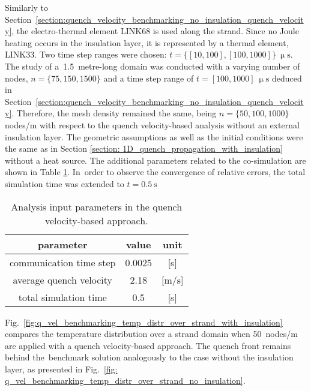 
Similarly to Section~\ref{section:quench_velocity_benchmarking_no_insulation_quench_velocity}, the electro-thermal element LINK68 is used along the strand. Since no Joule heating occurs in the insulation layer, it is represented by a thermal element, LINK33. Two time step ranges were chosen: $t=\{[10, 100], [100, 1000]\}~\upmu \text{s}$. The study of a~1.5~metre-long domain was conducted with a varying number of nodes, $n=\{75, 150, 1500\}$ and a time step range of $t=[100, 1000]~\upmu \text{s}$ deduced in Section~\ref{section:quench_velocity_benchmarking_no_insulation_quench_velocity}. Therefore, the mesh density remained the same, being $n=\{50, 100, 1000\}$ nodes/m  with respect to the quench velocity-based analysis without an external insulation layer. The geometric assumptions as well as the initial conditions were the same as in Section \ref{section: 1D_quench_propagation_with_insulation} without a heat source. The additional parameters related to the co-simulation are shown in Table \ref{table:1d_qv_benchmarking_geometry__with_insulation_parameters_quench_velocity}. In~order to observe the convergence of relative errors, the total simulation time was extended to $t=0.5~\text{s}$

\begin{table}[H]
    \caption{Analysis input parameters in the quench velocity-based approach.} 
    \vspace{-1.em} 
    \fontsize{10}{10}
    \selectfont 
    \renewcommand{\arraystretch}{1.5}
    \begin{center}
        \begin{tabular}{ ccc }  
        \hline
        parameter & value & unit \\
        \hline
        communication time step & 0.0025 & [s] \\
        average quench velocity & 2.18 & [m/s] \\
        total simulation time & 0.5 & [s] \\
        \hline 
        \end{tabular}
    \end{center}  
    \label{table:1d_qv_benchmarking_geometry__with_insulation_parameters_quench_velocity} 
\end{table}

Fig.~\ref{fig:q_vel_benchmarking_temp_distr_over_strand_with_insulation} compares the temperature distribution over a strand domain when 50~nodes/m are applied with a quench velocity-based approach. The quench front remains behind the~benchmark solution analogously to the case without the insulation layer, as presented in Fig.~\ref{fig: q_vel_benchmarking_temp_distr_over_strand_no_insulation}.

